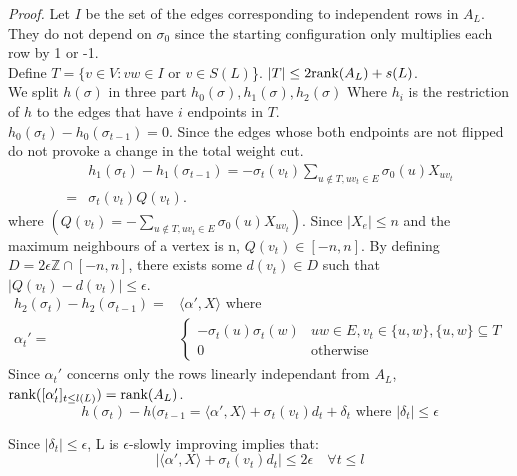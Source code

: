 \textit{Proof.} Let $I$ be the set of the edges corresponding to independent rows in $A_L$. They do not depend on $\sigma_0$ since the starting configuration only multiplies each row by 1 or -1.\\
Define $T = \{v \in V: vw \in I \text{ or } v \in S(L)$\}. $|T| \leq 2 \text{rank}(A_L) + s(L)$. \\
We split $h(\sigma)$ in three part $h_0(\sigma), h_1(\sigma), h_2(\sigma)$ Where $h_i$ is the restriction of $h$ to the edges that have $i$ endpoints in $T$. \\
$h_0(\sigma_t) - h_0(\sigma_{t -1}) = 0$. Since the edges whose both endpoints are not flipped do not provoke a change in the total weight cut. \\
\begin{equation*}
\begin{split}
&h_1(\sigma_t) - h_1(\sigma_{t-1}) = -\sigma_t(v_t)\sum_{u \not\in T, uv_t \in E}\sigma_0(u)X_{uv_t} \\
=& \sigma_t(v_t)Q(v_t).
\end{split}
\end{equation*}
where $(Q(v_t) = -\sum_{u \not\in T, uv_t \in E}\sigma_0(u)X_{uv_t})$. Since $|X_e| \leq n$ and the maximum neighbours of a vertex is n, $Q(v_t) \in [-n, n]$. By defining $D = 2\epsilon\mathbb Z \cap [-n, n]$, there exists some $d(v_t) \in D$ such that $|Q(v_t) - d(v_t)| \leq \epsilon$.\\
\begin{equation*}
\begin{split}
h_2(\sigma_t) - h_2(\sigma_{t-1}) = &\langle\alpha ', X \rangle \text{ where }\\
\alpha_t ' =  &
\begin{cases}
-\sigma_t(u)\sigma_t(w) & uw \in E, v_t \in \{u, w\}, \{u, w\} \subseteq T \\
0 & \text{otherwise}
\end{cases}
\end{split}
\end{equation*}
Since $\alpha_t'$ concerns only the rows linearly independant from $A_L$, $\text{rank}([\alpha_t']_{t \leq l(L)}) = \text{rank}(A_L)$. \\
\begin{equation*}
h(\sigma_t) - h(\sigma_{t-1} = \langle\alpha ', X \rangle +   \sigma_t(v_t)d_t + \delta_t \text{    where }|\delta_t| \leq \epsilon
\end{equation*}

Since  $|\delta_t| \leq \epsilon$, L is $\epsilon$-slowly improving implies that: 
\begin{equation*}
| \langle\alpha ', X \rangle +   \sigma_t(v_t)d_t| \leq 2\epsilon \quad \forall t \leq l
\end{equation*}

